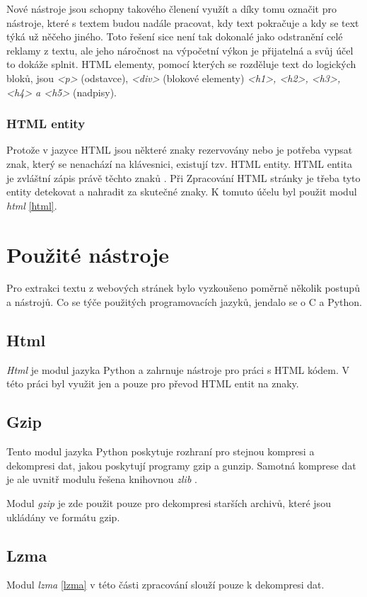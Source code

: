Nové nástroje jsou schopny takového členení využít a díky tomu označit pro nástroje,
které s textem budou nadále pracovat, kdy text pokračuje a kdy se text týká už něčeho jiného.
Toto řešení sice není tak dokonalé jako odstranění celé reklamy z textu, ale jeho náročnost na výpočetní
výkon je přijatelná a svůj účel to dokáže splnit. HTML elementy, pomocí
kterých se rozděluje text do logických bloků, jsou \textit{<p>} (odstavce),
\textit{<div>} (blokové elementy) \textit{<h1>, <h2>, <h3>, <h4> a <h5>} (nadpisy).

\subsubsection{HTML entity}
Protože v jazyce HTML jsou některé znaky rezervovány nebo je potřeba vypsat znak, který se nenachází na klávesnici,
existují tzv. HTML entity. HTML entita je zvláštní zápis právě těchto znaků \cite{HTML_ENTITES}. Při Zpracování
HTML stránky je třeba tyto entity detekovat a nahradit za skutečné znaky. K tomuto účelu byl použit modul
\textit{html} \ref{html}.

\section{Použité nástroje}
Pro extrakci textu z webových stránek bylo vyzkoušeno poměrně několik postupů a nástrojů. Co se týče použitých
programovacích jazyků, jendalo se o C a Python.

\subsection{Html}
\label{Html}
\textit{Html} je modul jazyka Python a zahrnuje nástroje pro práci s HTML kódem. V této práci byl využit jen a pouze pro
převod HTML entit na znaky.

\subsection{Gzip}
\label{gzip}
Tento modul jazyka Python poskytuje rozhraní pro stejnou kompresi a dekompresi dat, jakou poskytují programy gzip a gunzip.
Samotná komprese dat je ale uvnitř modulu řešena knihovnou \textit{zlib} \cite{GZIP}.

Modul \textit{gzip} je zde použit pouze pro dekompresi starších archivů, které jsou ukládány ve formátu gzip.

\subsection{Lzma}
Modul \textit{lzma} \ref{lzma} v této části zpracování slouží pouze k dekompresi dat.

